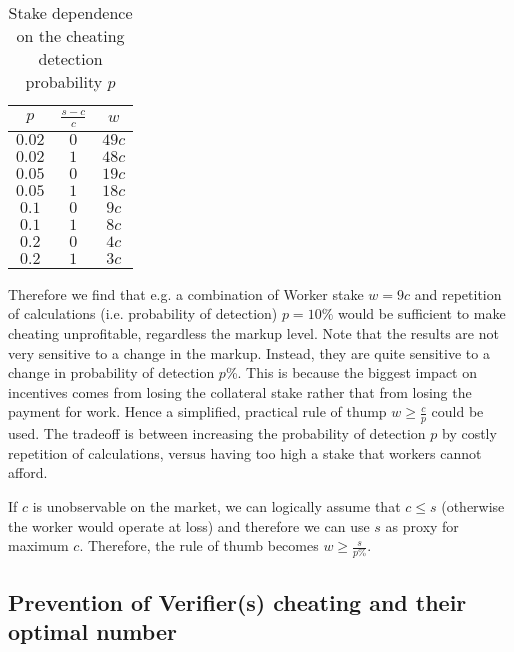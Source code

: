 \documentclass{article}
\begin{document}
\begin{table}[h]
    \caption{Stake dependence on the cheating detection probability $p$}
    \label{table:settlement}
    \begin{adjustbox}{center}
        \begin{tabular}{c c c}
            \toprule
            $p$ & $\frac{s-c}{c}$ & $w$ \\
            \midrule
            $0.02$ & $0$ & $49c$ \\
            $0.02$ & $1$ & $48c$ \\
            $0.05$ & $0$ & $19c$ \\
            $0.05$ & $1$ & $18c$ \\
            $0.1$ & $0$ & $9c$ \\
            $0.1$ & $1$ & $8c$ \\
            $0.2$ & $0$ & $4c$ \\
            $0.2$ & $1$ & $3c$ \\
            \bottomrule
        \end{tabular}
    \end{adjustbox}
\end{table}

Therefore we find that e.g. a combination of Worker stake $w=9c$ and repetition of calculations (i.e. probability of detection) $p=10\%$ would be sufficient to make cheating unprofitable, regardless the markup level. Note that the results are not very sensitive to a change in the markup. Instead, they are quite sensitive to a change in probability of detection $p$\%. This is because the biggest impact on incentives comes from losing the collateral stake rather that from losing the payment for work. Hence a simplified, practical rule of thump $w\geq \frac{c}{p}$ could be used. The tradeoff is between increasing the probability of detection $p$ by costly repetition of calculations, versus having too high a stake that workers cannot afford.

If $c$ is unobservable on the market, we can logically assume that $c\leq s$ (otherwise the worker would operate at loss) and therefore we can use $s$ as proxy for maximum $c$. Therefore, the rule of thumb becomes $w\geq \frac{s}{p\%}$.

\subsection{Prevention of Verifier(s) cheating and their optimal number}
\end{document}
